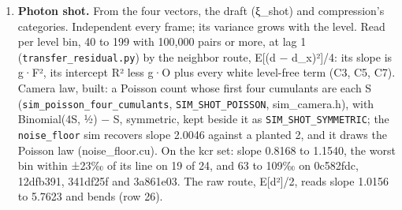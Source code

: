 \begin{enumerate}
\item \textbf{Photon shot.} From the four vectors, the draft (ξ\_\allowbreak{}shot) and compression's categories. Independent every frame; its variance grows with the level. Read per level bin, 40 to 199 with 100,000 pairs or more, at lag 1 (\texttt{transfer\_\allowbreak{}residual.\allowbreak{}py}) by the neighbor route, E[(d − d\_\allowbreak{}x)²]/4: its slope is g·F², its intercept R² less g·O plus every white level-free term (C3, C5, C7). Camera law, built: a Poisson count whose first four cumulants are each S (\texttt{sim\_\allowbreak{}poisson\_\allowbreak{}four\_\allowbreak{}cumulants}, \texttt{SIM\_\allowbreak{}SHOT\_\allowbreak{}POISSON}, sim\_\allowbreak{}camera.h), with Binomial(4S, ½) − S, symmetric, kept beside it as \texttt{SIM\_\allowbreak{}SHOT\_\allowbreak{}SYMMETRIC}; the \texttt{noise\_\allowbreak{}floor} sim recovers slope 2.0046 against a planted 2, and it draws the Poisson law (noise\_\allowbreak{}floor.cu). On the kcr set: slope 0.8168 to 1.1540, the worst bin within ±23‰ of its line on 19 of 24, and 63 to 109‰ on 0c582fdc, 12dfb391, 341df25f and 3a861e03. The raw route, E[d²]/2, reads slope 1.0156 to 5.7623 and bends (row 26).


\end{enumerate}
